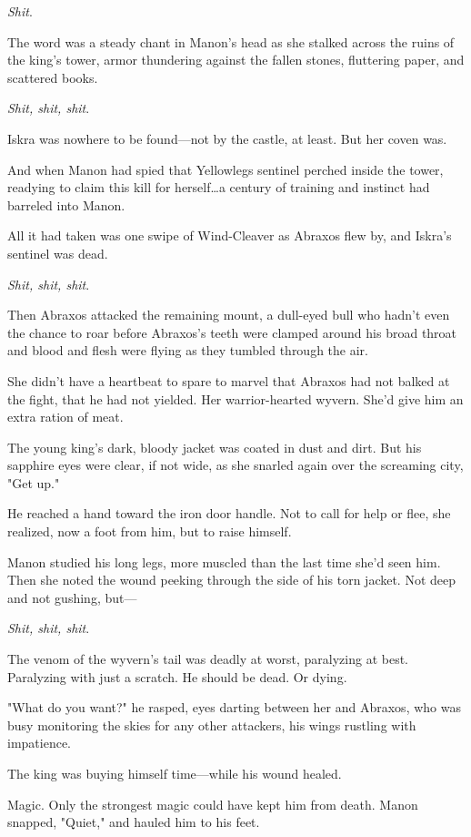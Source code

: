 \emph{Shit}.

The word was a steady chant in Manon's head as she stalked across the ruins of the king's tower, armor thundering against the fallen stones, fluttering paper, and scattered books.

\emph{Shit, shit, shit}.

Iskra was nowhere to be found---not by the castle, at least.
But her coven was.

And when Manon had spied that Yellowlegs sentinel perched inside the tower, readying to claim this kill for herself\ldots a century of training and instinct had barreled into Manon.

All it had taken was one swipe of Wind-Cleaver as Abraxos flew by, and Iskra's sentinel was dead.

\emph{Shit, shit, shit}.

Then Abraxos attacked the remaining mount, a dull-eyed bull who hadn't even the chance to roar before Abraxos's teeth were clamped around his broad throat and blood and flesh were flying as they tumbled through the air.

She didn't have a heartbeat to spare to marvel that Abraxos had not balked at the fight, that he had not yielded.
Her warrior-hearted wyvern.
She'd give him an extra ration of meat.

The young king's dark, bloody jacket was coated in dust and dirt.
But his sapphire eyes were clear, if not wide, as she snarled again over the screaming city, "Get up."

He reached a hand toward the iron door handle.
Not to call for help or flee, she realized, now a foot from him, but to raise himself.

Manon studied his long legs, more muscled than the last time she'd seen him.
Then she noted the wound peeking through the side of his torn jacket.
Not deep and not gushing, but---

\emph{Shit, shit, shit}.

The venom of the wyvern's tail was deadly at worst, paralyzing at best.
Paralyzing with just a scratch.
He should be dead.
Or dying.

"What do you want?"
he rasped, eyes darting between her and Abraxos, who was busy monitoring the skies for any other attackers, his wings rustling with impatience.

The king was buying himself time---while his wound healed.

Magic.
Only the strongest magic could have kept him from death.
Manon snapped, "Quiet," and hauled him to his feet.

